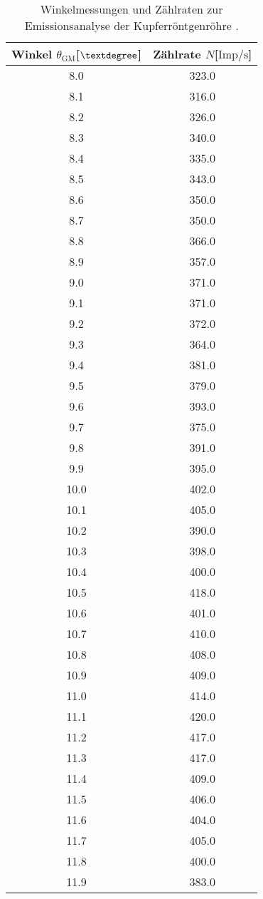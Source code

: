 \begin{table}\tiny
\caption{Winkelmessungen und Zählraten zur Emissionsanalyse der Kupferröntgenröhre \cite{hinweis}.}
\begin{minipage}{0.5\textwidth}
\centering
\label{tab:ogemessdaten2}
\begin{tabular}{c c}
    \toprule
    Winkel $\theta_{\text{GM}}$[$\textdegree$] & Zählrate $N$[$\si{{\text{Imp}}\per\second}$]\\
    \midrule
8.0	&	323.0\\
8.1	&	316.0\\
8.2	&	326.0\\
8.3	&	340.0\\
8.4	&	335.0\\
8.5	&	343.0\\
8.6	&	350.0\\
8.7	&	350.0\\
8.8	&	366.0\\
8.9	&	357.0\\
9.0	&	371.0\\
9.1	&	371.0\\
9.2	&	372.0\\
9.3	&	364.0\\
9.4	&	381.0\\
9.5	&	379.0\\
9.6	&	393.0\\
9.7	&	375.0\\
9.8	&	391.0\\
9.9	&	395.0\\
10.0&	402.0\\
10.1&	405.0\\
10.2&	390.0\\
10.3&	398.0\\
10.4&	400.0\\
10.5&	418.0\\
10.6&	401.0\\
10.7&	410.0\\
10.8&	408.0\\
10.9&	409.0\\
11.0&	414.0\\
11.1&	420.0\\
11.2&	417.0\\
11.3&	417.0\\
11.4&	409.0\\
11.5&	406.0\\
11.6&	404.0\\
11.7&	405.0\\
11.8&	400.0\\
11.9&	383.0\\

\end{tabular}
\end{minipage}
\end{table}
